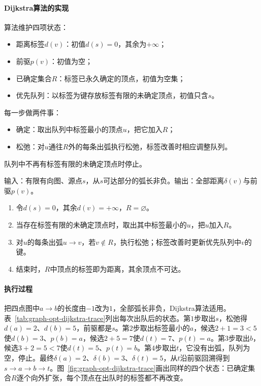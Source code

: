 \paragraph{Dijkstra算法的实现}
算法维护四项状态：
\begin{itemize}
  \item 距离标签$d(v)$：初值$d(s)=0$，其余为$+\infty$；
  \item 前驱$p(v)$：初值为空；
  \item 已确定集合$R$：标签已永久确定的顶点，初值为空集；
  \item 优先队列：以标签为键存放标签有限的未确定顶点，初值只含$s$。
\end{itemize}
每一步做两件事：
\begin{itemize}
  \item 确定：取出队列中标签最小的顶点$u$，把它加入$R$；
  \item 松弛：对$u$通往$R$外的每条出弧执行松弛，标签改善时相应调整队列。
\end{itemize}
队列中不再有标签有限的未确定顶点时停止。

\begin{algorithm}[Dijkstra算法]
\label{alg:graph-opt-dijkstra}
输入：有限有向图、源点$s$，从$s$可达部分的弧长非负。输出：全部距离$\delta(v)$与前驱$p(v)$。
\begin{enumerate}
  \item 令$d(s)=0$，其余$d(v)=+\infty$，$R=\varnothing$。
  \item 当存在标签有限的未确定顶点时，取出其中标签最小的$u$，把$u$加入$R$。
  \item 对$u$的每条出弧$u\to v$，若$v\notin R$，执行松弛；标签改善时更新优先队列中$v$的键。
  \item 结束时，$R$中顶点的标签即为距离，其余顶点不可达。
\end{enumerate}
\end{algorithm}

\paragraph{执行过程}
把四点图中$a\to b$的长度由$-1$改为$1$，全部弧长非负，Dijkstra算法适用。表~\ref{tab:graph-opt-dijkstra-trace}列出每次出队后的状态。第$1$步取出$s$，松弛得$d(a)=2$、$d(b)=5$，前驱都是$s$。第$2$步取出标签最小的$a$，候选$2+1=3<5$使$d(b)=3$、$p(b)=a$，候选$2+5=7$使$d(t)=7$、$p(t)=a$。第$3$步取出$b$，候选$3+2=5<7$使$d(t)=5$、$p(t)=b$。第$4$步取出$t$，它没有出弧，队列为空，停止。最终$\delta(a)=2$、$\delta(b)=3$、$\delta(t)=5$，从$t$沿前驱回溯得到$s\to a\to b\to t$。图~\ref{fig:graph-opt-dijkstra-trace}画出同样的四个状态：已确定集合$R$逐个向外扩张，每个顶点在出队时的标签都不再改变。

